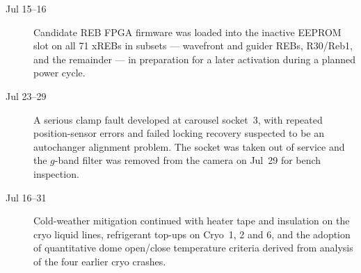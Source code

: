 \begin{description}
\item[Jul 15--16] Candidate REB FPGA firmware was loaded into the
  inactive EEPROM slot on all 71 xREBs in subsets --- wavefront and
  guider REBs, R30/Reb1, and the remainder --- in preparation for a
  later activation during a planned power cycle.

\item[Jul 23--29] A serious clamp fault developed at carousel
  socket~3, with repeated position-sensor errors and failed locking
  recovery suspected to be an autochanger alignment problem.  The
  socket was taken out of service and the $g$-band filter was removed
  from the camera on Jul~29 for bench inspection.

\item[Jul 16--31] Cold-weather mitigation continued with heater tape
  and insulation on the cryo liquid lines, refrigerant top-ups on
  Cryo~1, 2 and 6, and the adoption of quantitative dome open/close
  temperature criteria derived from analysis of the four earlier cryo
  crashes.
\end{description}

